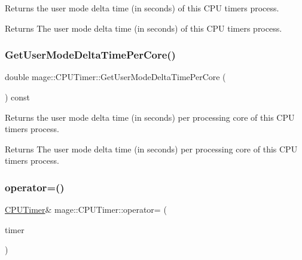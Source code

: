 Returns the user mode delta time (in seconds) of this C\+PU timer\textquotesingle{}s process.

\begin{DoxyReturn}{Returns}
The user mode delta time (in seconds) of this C\+PU timer\textquotesingle{}s process. 
\end{DoxyReturn}
\hypertarget{classmage_1_1_c_p_u_timer_af6f972b523d00a83d5360f61bf0a1e50}{}\label{classmage_1_1_c_p_u_timer_af6f972b523d00a83d5360f61bf0a1e50} 
\subsubsection{\texorpdfstring{Get\+User\+Mode\+Delta\+Time\+Per\+Core()}{GetUserModeDeltaTimePerCore()}}
{\footnotesize\ttfamily double mage\+::\+C\+P\+U\+Timer\+::\+Get\+User\+Mode\+Delta\+Time\+Per\+Core (\begin{DoxyParamCaption}{ }\end{DoxyParamCaption}) const}

Returns the user mode delta time (in seconds) per processing core of this C\+PU timer\textquotesingle{}s process.

\begin{DoxyReturn}{Returns}
The user mode delta time (in seconds) per processing core of this C\+PU timer\textquotesingle{}s process. 
\end{DoxyReturn}
\hypertarget{classmage_1_1_c_p_u_timer_aa453ec0f437762bff5c33ea344329d10}{}\label{classmage_1_1_c_p_u_timer_aa453ec0f437762bff5c33ea344329d10} 
\subsubsection{\texorpdfstring{operator=()}{operator=()}\hspace{0.1cm}{\footnotesize\ttfamily [1/2]}}
{\footnotesize\ttfamily \hyperlink{classmage_1_1_c_p_u_timer}{C\+P\+U\+Timer}\& mage\+::\+C\+P\+U\+Timer\+::operator= (\begin{DoxyParamCaption}\item[{const \hyperlink{classmage_1_1_c_p_u_timer}{C\+P\+U\+Timer} \&}]{timer }\end{DoxyParamCaption})\hspace{0.3cm}{\ttfamily [default]}}

